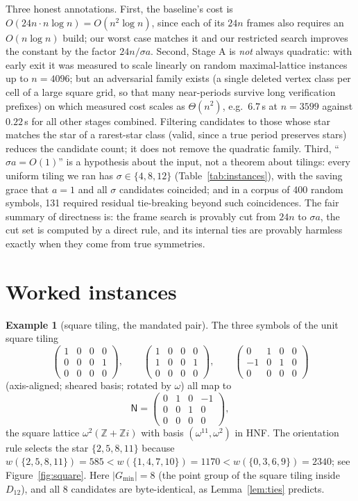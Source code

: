 \documentclass[11pt]{article}
\theoremstyle{definition}
\newtheorem{example}[theorem]{Example}
\newcommand{\Z}{\mathbb{Z}}
\newcommand{\Gmin}{G_{\min}}
\newcommand{\N}{\mathsf{N}}
\newcommand{\word}{w}
\begin{document}
Three honest annotations. First, the baseline's cost is $O(24n\cdot n\log n)=O(n^2\log n)$,
since each of its $24n$ frames also requires an $O(n\log n)$ build; our worst case matches
it and our restricted search improves the constant by the factor $24n/\sigma a$. Second,
Stage A is \emph{not} always quadratic: with early exit it was measured to scale linearly
on random maximal-lattice instances up to $n=4096$; but an adversarial family exists (a
single deleted vertex class per cell of a large square grid, so that many near-periods
survive long verification prefixes) on which measured cost scales as $\Theta(n^2)$, e.g.\
$6.7$\,s at $n=3599$ against $0.22$\,s for all other stages combined. Filtering candidates
to those whose star matches the star of a rarest-star class (valid, since a true period
preserves stars) reduces the candidate count; it does not remove the quadratic family.
Third, ``$\sigma a=O(1)$'' is a hypothesis about the input, not a theorem about tilings:
every uniform tiling we ran has $\sigma\in\{4,8,12\}$ (Table~\ref{tab:instances}), with the
saving grace that $a=1$ and all $\sigma$ candidates coincided; and in a corpus of 400
random symbols, 131 required residual tie-breaking beyond such coincidences. The fair
summary of directness is: the frame search is provably cut from $24n$ to
$\sigma a$, the cut set is computed by a direct rule, and its internal ties are provably
harmless exactly when they come from true symmetries.

\section{Worked instances}\label{sec:instances}

\begin{example}[square tiling, the mandated pair]\label{ex:square}
The three symbols of the unit square tiling
\[
  \begin{pmatrix}1&0&0&0\\0&0&0&1\\0&0&0&0\end{pmatrix},\qquad
  \begin{pmatrix}1&0&0&0\\1&0&0&1\\0&0&0&0\end{pmatrix},\qquad
  \begin{pmatrix}0&1&0&0\\-1&0&1&0\\0&0&0&0\end{pmatrix}
\]
(axis-aligned; sheared basis; rotated by $\omega$) all map to
\[
  \N=\begin{pmatrix}0&1&0&-1\\0&0&1&0\\0&0&0&0\end{pmatrix},
\]
the square lattice $\omega^2(\Z+\Z i)$ with basis $(\omega^{11},\omega^2)$ in HNF. The
orientation rule selects the star $\{2,5,8,11\}$ because
$\word(\{2,5,8,11\})=585<\word(\{1,4,7,10\})=1170<\word(\{0,3,6,9\})=2340$; see
Figure~\ref{fig:square}. Here $|\Gmin|=8$ (the point group of the square tiling inside
$D_{12}$), and all 8 candidates are byte-identical, as Lemma~\ref{lem:ties} predicts.
\end{example}
\end{document}
